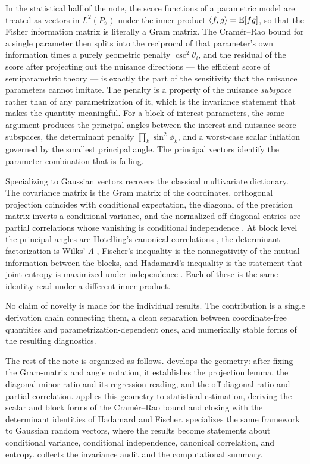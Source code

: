 \documentclass{IEEEtran}
\begin{document}
In the statistical half of the note, the score functions of a parametric model are treated as vectors in $L^{2}(P_{\vartheta})$ under the inner product $\langle f,g\rangle = \operatorname{E}[fg]$, so that the Fisher information matrix is literally a Gram matrix. The Cram\'er--Rao bound for a single parameter then splits into the reciprocal of that parameter's own information times a purely geometric penalty $\csc^{2}\theta_{i}$, and the residual of the score after projecting out the nuisance directions --- the efficient score of semiparametric theory \cite{bickel1993,cox1987} --- is exactly the part of the sensitivity that the nuisance parameters cannot imitate. The penalty is a property of the nuisance \emph{subspace} rather than of any parametrization of it, which is the invariance statement that makes the quantity meaningful. For a block of interest parameters, the same argument produces the principal angles \cite{bjorck1973} between the interest and nuisance score subspaces, the determinant penalty $\prod_{k}\sin^{2}\phi_{k}$, and a worst-case scalar inflation governed by the smallest principal angle. The principal vectors identify the parameter combination that is failing.

Specializing to Gaussian vectors recovers the classical multivariate dictionary. The covariance matrix is the Gram matrix of the coordinates, orthogonal projection coincides with conditional expectation, the diagonal of the precision matrix inverts a conditional variance, and the normalized off-diagonal entries are partial correlations whose vanishing is conditional independence \cite{lauritzen1996}. At block level the principal angles are Hotelling's canonical correlations \cite{hotelling1936}, the determinant factorization is Wilks' $\Lambda$ \cite{wilks1932,anderson2003}, Fischer's inequality is the nonnegativity of the mutual information between the blocks, and Hadamard's inequality is the statement that joint entropy is maximized under independence \cite{cover2006}. Each of these is the same identity read under a different inner product.

No claim of novelty is made for the individual results. The contribution is a single derivation chain connecting them, a clean separation between coordinate-free quantities and parametrization-dependent ones, and numerically stable forms of the resulting diagnostics.

The rest of the note is organized as follows.  develops the geometry: after fixing the Gram-matrix and angle notation, it establishes the projection lemma, the diagonal minor ratio and its regression reading, and the off-diagonal ratio and partial correlation.  applies this geometry to statistical estimation, deriving the scalar and block forms of the Cram\'er--Rao bound and closing with the determinant identities of Hadamard and Fischer.  specializes the same framework to Gaussian random vectors, where the results become statements about conditional variance, conditional independence, canonical correlation, and entropy.  collects the invariance audit and the computational summary.
\end{document}

